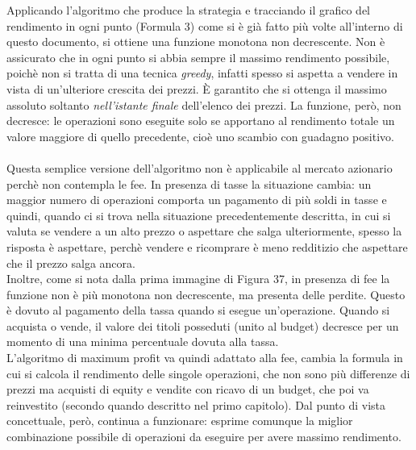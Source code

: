 \documentclass[a4paper,12pt]{report}
\begin{document}
\begin{fig}
Applicando l'algoritmo che produce la strategia e tracciando il grafico del rendimento in ogni punto (Formula 3) come si è già fatto più volte all'interno di questo documento, si ottiene una funzione monotona non decrescente. Non è assicurato che in ogni punto si abbia sempre il massimo rendimento possibile, poichè non si tratta di una tecnica \textit{greedy}, infatti spesso si aspetta a vendere in vista di un'ulteriore crescita dei prezzi. È garantito che si ottenga il massimo assoluto soltanto \textit{nell'istante finale} dell'elenco dei prezzi. La funzione, però, non decresce: le operazioni sono eseguite solo se apportano al rendimento totale un valore maggiore di quello precedente, cioè uno scambio con guadagno positivo.
\\~\\ Questa semplice versione dell'algoritmo non è applicabile al mercato azionario perchè non contempla le fee. In presenza di tasse la situazione cambia: un maggior numero di operazioni comporta un pagamento di più soldi in tasse e quindi, quando ci si trova nella situazione precedentemente descritta, in cui si valuta se vendere a un alto prezzo o aspettare che salga ulteriormente, spesso la risposta è aspettare, perchè vendere e ricomprare è meno redditizio che aspettare che il prezzo salga ancora.\\
Inoltre, come si nota dalla prima immagine di Figura 37, in presenza di fee la funzione non è più monotona non decrescente, ma presenta delle perdite. Questo è dovuto al pagamento della tassa quando si esegue un'operazione. Quando si acquista o vende, il valore dei titoli posseduti (unito al budget) decresce per un momento di una minima percentuale dovuta alla tassa.\\L'algoritmo di maximum profit va quindi adattato alla fee, cambia la formula in cui si calcola il rendimento delle singole operazioni, che non sono più differenze di prezzi ma acquisti di equity e vendite con ricavo di un budget, che poi va reinvestito (secondo quando descritto nel primo capitolo). Dal punto di vista concettuale, però, continua a funzionare: esprime comunque la miglior combinazione possibile di operazioni da eseguire per avere massimo rendimento.


\end{fig}
\end{document}
